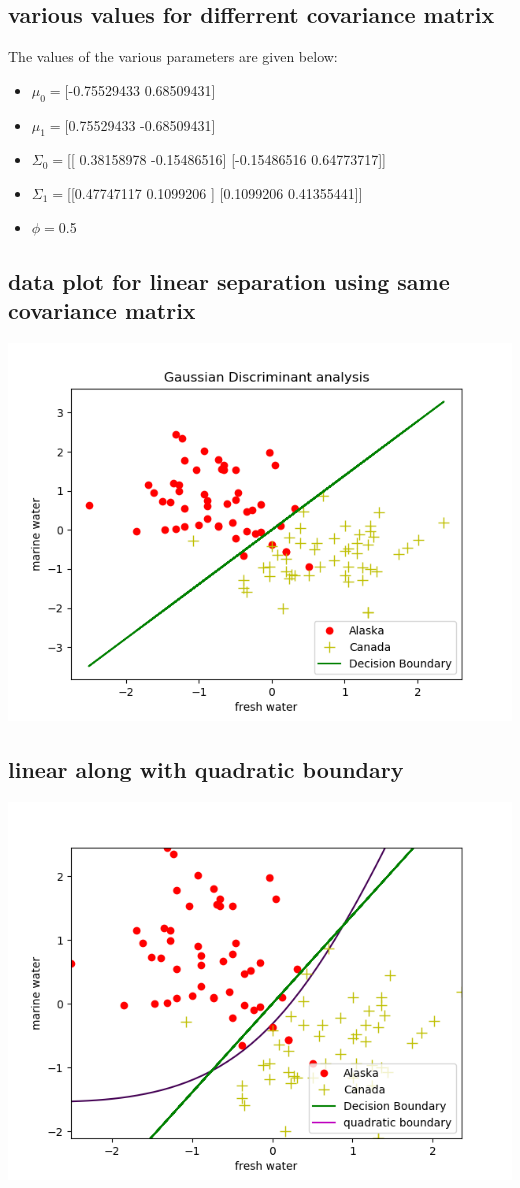 \documentclass[10pt]{article}
\begin{document}
\subsection{various values for differrent covariance matrix}
The values of the various parameters are given below:
\begin{itemize}
\item $\mu_0=$[-0.75529433  0.68509431]
\item $\mu_1=$[0.75529433  -0.68509431]
\item $\Sigma_0=$[[ 0.38158978 -0.15486516]
 [-0.15486516  0.64773717]]
\item $\Sigma_1=$[[0.47747117 0.1099206 ]
 [0.1099206  0.41355441]]
\item $\phi=$0.5
\end{itemize} 
\subsection{data plot for linear separation using same covariance matrix}
\begin{center}
\includegraphics[scale=0.8]{gline.png} 
\end{center}
\subsection{linear along with quadratic boundary}
\begin{center}
\includegraphics[scale=0.8]{gaussianwline.png} 
\end{center}
\end{document}
